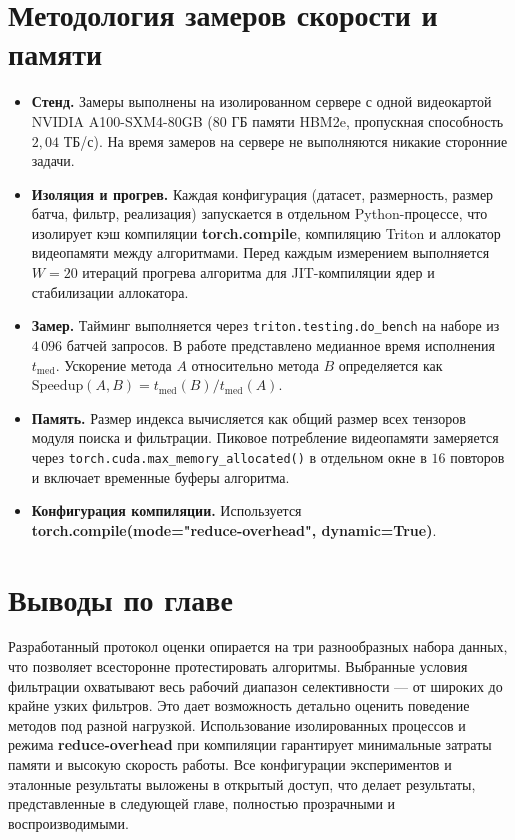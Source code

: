 \documentclass[14pt,a4paper]{extreport}
\numberwithin{figure}{chapter}
\numberwithin{table}{chapter}
\numberwithin{equation}{chapter}
\newcommand{\chapterconclusions}{
    \section{Выводы по главе}
}
\begin{document}
\section{Методология замеров скорости и памяти}

\begin{itemize}
    \item \textbf{Стенд.} Замеры выполнены на изолированном сервере с одной видеокартой NVIDIA A100-SXM4-80GB ($80$ ГБ памяти HBM2e, пропускная способность $2{,}04$ ТБ/с). На время замеров на сервере не выполняются никакие сторонние задачи.
    \item \textbf{Изоляция и прогрев.} Каждая конфигурация (датасет, размерность, размер батча, фильтр, реализация) запускается в отдельном Python-процессе, что изолирует кэш компиляции \textbf{torch.compile}, компиляцию Triton и аллокатор видеопамяти между алгоритмами. Перед каждым измерением выполняется $W = 20$ итераций прогрева алгоритма для JIT-компиляции ядер и стабилизации аллокатора.
    \item \textbf{Замер.} Тайминг выполняется через \texttt{triton.testing.do\_bench} на наборе из $4\,096$ батчей запросов. В работе представлено медианное время исполнения $t_\mathrm{med}$. Ускорение метода $A$ относительно метода $B$ определяется как $\mathrm{Speedup}(A,B) = t_\mathrm{med}(B) / t_\mathrm{med}(A)$.
    \item \textbf{Память.} Размер индекса вычисляется как общий размер всех тензоров модуля поиска и фильтрации. Пиковое потребление видеопамяти замеряется через \texttt{torch.cuda.max\_memory\_allocated()} в отдельном окне в $16$ повторов и включает временные буферы алгоритма.
    \item \textbf{Конфигурация компиляции.} Используется \textbf{torch.compile(mode="reduce-overhead", dynamic=True)}.
\end{itemize}

\chapterconclusions

Разработанный протокол оценки опирается на три разнообразных набора данных, что позволяет всесторонне протестировать алгоритмы. Выбранные условия фильтрации охватывают весь рабочий диапазон селективности --- от широких до крайне узких фильтров. Это дает возможность детально оценить поведение методов под разной нагрузкой. Использование изолированных процессов и режима \textbf{reduce-overhead} при компиляции гарантирует минимальные затраты памяти и высокую скорость работы. Все конфигурации экспериментов и эталонные результаты выложены в открытый доступ, что делает результаты, представленные в следующей главе, полностью прозрачными и воспроизводимыми.
\end{document}

